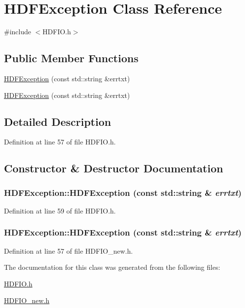 \section{HDFException Class Reference}
\label{classHDFException}


{\ttfamily \#include $<$HDFIO.h$>$}

\subsection*{Public Member Functions}
\begin{DoxyCompactItemize}
\item 
\hyperlink{classHDFException_af69c871e4d8d5f2db48cd54525e8ba86}{HDFException} (const std::string \&errtxt)
\item 
\hyperlink{classHDFException_af69c871e4d8d5f2db48cd54525e8ba86}{HDFException} (const std::string \&errtxt)
\end{DoxyCompactItemize}


\subsection{Detailed Description}


Definition at line 57 of file HDFIO.h.



\subsection{Constructor \& Destructor Documentation}
\subsubsection[{HDFException}]{\setlength{\rightskip}{0pt plus 5cm}HDFException::HDFException (const std::string \& {\em errtxt})}\label{classHDFException_af69c871e4d8d5f2db48cd54525e8ba86}


Definition at line 59 of file HDFIO.h.

\subsubsection[{HDFException}]{\setlength{\rightskip}{0pt plus 5cm}HDFException::HDFException (const std::string \& {\em errtxt})}\label{classHDFException_af69c871e4d8d5f2db48cd54525e8ba86}


Definition at line 57 of file HDFIO\_\-new.h.



The documentation for this class was generated from the following files:\begin{DoxyCompactItemize}
\item 
\hyperlink{HDFIO_8h}{HDFIO.h}\item 
\hyperlink{HDFIO__new_8h}{HDFIO\_\-new.h}\end{DoxyCompactItemize}
